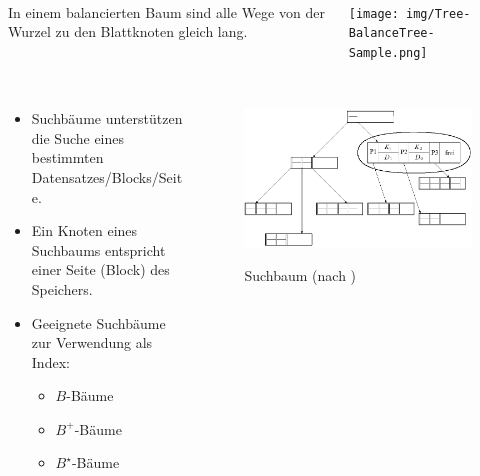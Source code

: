 \begin{frame}{\insertsection}
\framesubtitle{\insertsubsection}
\begin{columns}
	\begin{column}{.6\textwidth}
		\begin{definition}
			In einem balancierten Baum sind alle Wege von der Wurzel zu den Blattknoten gleich lang. 
		\end{definition}
	\end{column}
	\begin{column}{.3\textwidth}
		\texttt{[image: img/Tree-BalanceTree-Sample.png]}
	\end{column}
\end{columns}
\end{frame}

\begin{frame}{\insertsection}
\framesubtitle{\insertsubsection}
\begin{columns}
	\begin{column}{.48\textwidth}
		\begin{itemize}
			\item Suchbäume unterst\"utzen die Suche eines bestimmten Datensatzes/Blocks/Seite.
			\item Ein Knoten eines Suchbaums entspricht einer Seite (Block) des Speichers.
			\pause
			\ \\[12pt]
			\item Geeignete Suchb\"aume zur Verwendung als Index:
			\begin{itemize}
				\item {\normalsize $B$-B\"aume}
				\item {\normalsize $B^+$-B\"aume}
				\item {\normalsize $B^\star$-B\"aume}
			\end{itemize}
		\end{itemize}
	\end{column}
	\onslide
	\begin{column}{.58\textwidth}
		\begin{figure}
			\includegraphics[scale=0.39]{img/BTree-1.png}
			\\[-10pt]\caption{Suchbaum (nach \cite{KE15})}
		\end{figure}
	\end{column}
\end{columns}
\end{frame}

